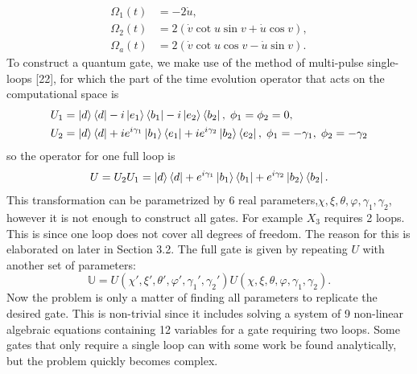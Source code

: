 \begin{equation}
\begin{aligned}
\Omega_1(t) &= -2\dot{u},
\\ 
\Omega_2(t) &= 2\left(\dot{v}\cot u\sin v + \dot{u}\cos v \right),
\\
\Omega_a(t) &= 2\left(\dot{v}\cot u\cos v - \dot{u}\sin v \right).
\end{aligned}
\end{equation}
To construct a quantum gate, we make use of the method of multi-pulse single-loops [22], for which the part of the time evolution operator that acts on the computational space is
\begin{equation}
\begin{aligned}&
U_1 = \ket{d}\bra{d} -i\ket{e_1}\bra{b_1} -i\ket{e_2}\bra{b_2},\; \phi_1 = \phi_2 = 0,
\\&
U_2 = \ket{d}\bra{d} +ie^{i\gamma_1}\ket{b_1}\bra{e_1} +ie^{i\gamma_2}\ket{b_2}\bra{e_2},\; \phi_1 = -\gamma_1,\; \phi_2 = -\gamma_2
\end{aligned}
\end{equation}
so the operator for one full loop is 
\begin{equation}
\label{eq:trit-gate-1-loop}
U = U_2U_1 = \ket{d}\bra{d} + e^{i\gamma_1}\ket{b_1}\bra{b_1} + e^{i\gamma_2}\ket{b_2}\bra{b_2}.
\end{equation}
This transformation can be parametrized by $6$ real parameters,$\chi,\xi,\theta,\varphi,\gamma_1,\gamma_2$, however it is not enough to construct all gates. For example $X_3$ requires 2 loops. This is since one loop does not cover all degrees of freedom. The reason for this is elaborated on later in Section 3.2. The full gate is given by repeating $U$ with another set of parameters:
\begin{equation}
\label{eq:trit-gate-2-loop}
\mathbb{U} = U(\chi',\xi',\theta',\varphi',\gamma_1',\gamma_2') U(\chi,\xi,\theta,\varphi,\gamma_1,\gamma_2).
\end{equation}
Now the problem is only a matter of finding all parameters to replicate the desired gate. This is non-trivial since it includes solving a system of 9 non-linear algebraic equations containing 12 variables for a gate requiring two loops. Some gates that only require a single loop can with some work be found analytically, but the problem quickly becomes complex.


